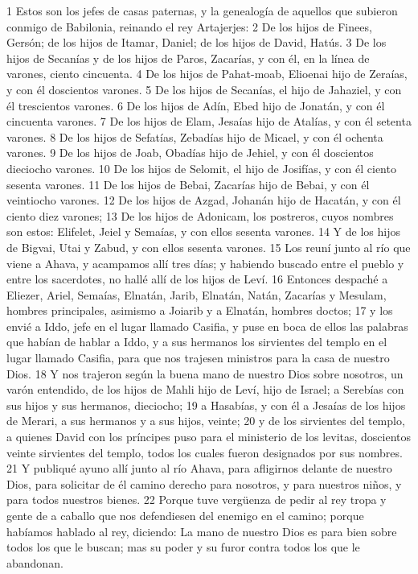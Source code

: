 1 Estos son los jefes de casas paternas, y la genealogía de aquellos que subieron conmigo de Babilonia, reinando el rey Artajerjes:
2 De los hijos de Finees, Gersón; de los hijos de Itamar, Daniel; de los hijos de David, Hatús.
3 De los hijos de Secanías y de los hijos de Paros, Zacarías, y con él, en la línea de varones, ciento cincuenta.
4 De los hijos de Pahat-moab, Elioenai hijo de Zeraías, y con él doscientos varones.
5 De los hijos de Secanías, el hijo de Jahaziel, y con él trescientos varones.
6 De los hijos de Adín, Ebed hijo de Jonatán, y con él cincuenta varones.
7 De los hijos de Elam, Jesaías hijo de Atalías, y con él setenta varones.
8 De los hijos de Sefatías, Zebadías hijo de Micael, y con él ochenta varones.
9 De los hijos de Joab, Obadías hijo de Jehiel, y con él doscientos dieciocho varones.
10 De los hijos de Selomit, el hijo de Josifías, y con él ciento sesenta varones.
11 De los hijos de Bebai, Zacarías hijo de Bebai, y con él veintiocho varones.
12 De los hijos de Azgad, Johanán hijo de Hacatán, y con él ciento diez varones;
13 De los hijos de Adonicam, los postreros, cuyos nombres son estos: Elifelet, Jeiel y Semaías, y con ellos sesenta varones.
14 Y de los hijos de Bigvai, Utai y Zabud, y con ellos sesenta varones.
15 Los reuní junto al río que viene a Ahava, y acampamos allí tres días; y habiendo buscado entre el pueblo y entre los sacerdotes, no hallé allí de los hijos de Leví.
16 Entonces despaché a Eliezer, Ariel, Semaías, Elnatán, Jarib, Elnatán, Natán, Zacarías y Mesulam, hombres principales, asimismo a Joiarib y a Elnatán, hombres doctos;
17 y los envié a Iddo, jefe en el lugar llamado Casifia, y puse en boca de ellos las palabras que habían de hablar a Iddo, y a sus hermanos los sirvientes del templo en el lugar llamado Casifia, para que nos trajesen ministros para la casa de nuestro Dios.
18 Y nos trajeron según la buena mano de nuestro Dios sobre nosotros, un varón entendido, de los hijos de Mahli hijo de Leví, hijo de Israel; a Serebías con sus hijos y sus hermanos, dieciocho;
19 a Hasabías, y con él a Jesaías de los hijos de Merari, a sus hermanos y a sus hijos, veinte;
20 y de los sirvientes del templo, a quienes David con los príncipes puso para el ministerio de los levitas, doscientos veinte sirvientes del templo, todos los cuales fueron designados por sus nombres.
21 Y publiqué ayuno allí junto al río Ahava, para afligirnos delante de nuestro Dios, para solicitar de él camino derecho para nosotros, y para nuestros niños, y para todos nuestros bienes.
22 Porque tuve vergüenza de pedir al rey tropa y gente de a caballo que nos defendiesen del enemigo en el camino; porque habíamos hablado al rey, diciendo: La mano de nuestro Dios es para bien sobre todos los que le buscan; mas su poder y su furor contra todos los que le abandonan.
